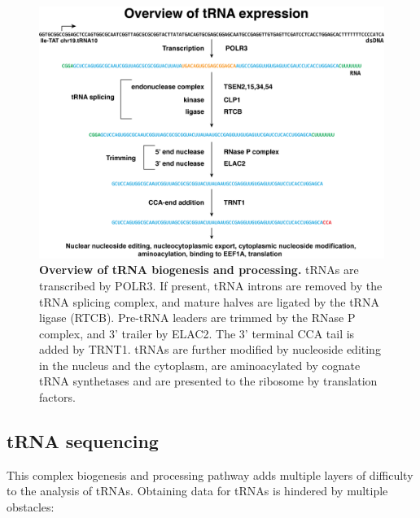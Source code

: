 \documentclass[12pt]{rockefeller}
\begin{document}
\begin{figure}[!ht]%
\centering
\includegraphics[width=\textwidth]{biogenesis2.png}%
\caption[tRNA biogensis]{\textbf{Overview of tRNA biogenesis and processing.} tRNAs are transcribed by POLR3. If present, tRNA introns are removed by the tRNA splicing complex, and mature halves are ligated by the tRNA ligase (RTCB). Pre-tRNA leaders are trimmed by the RNase P complex, and 3' trailer by ELAC2. The 3' terminal CCA tail is added by TRNT1. tRNAs are further modified by nucleoside editing in the nucleus and the cytoplasm, are aminoacylated by cognate tRNA synthetases and are presented to the ribosome by translation factors.}
\label{biogenesis}%
\end{figure}

\subsection{tRNA sequencing}
This complex biogenesis and processing pathway adds multiple layers of difficulty to the analysis of tRNAs. Obtaining  data for tRNAs is hindered by multiple obstacles:
\end{document}
